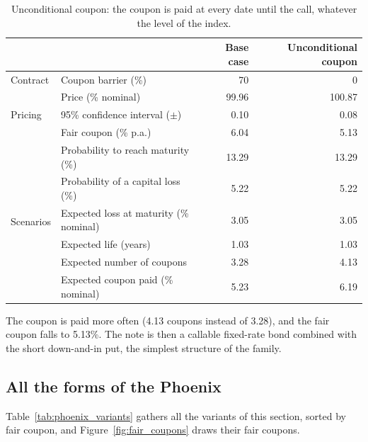 \documentclass[11pt,a4paper]{article}
\begin{document}
\begin{table}[htbp]
  \centering
  \small
  \begin{tabular}{llrr}
    \toprule
     & & \textbf{Base case} & \textbf{Unconditional coupon} \\
    \midrule
    \multirow{1}{*}{Contract}
      & Coupon barrier (\%) & 70 & 0 \\
    \midrule
    \multirow{3}{*}{Pricing}
      & Price (\% nominal) & 99.96 & 100.87 \\
      & 95\% confidence interval ($\pm$) & 0.10 & 0.08 \\
      & Fair coupon (\% p.a.) & 6.04 & 5.13 \\
    \midrule
    \multirow{6}{*}{Scenarios}
      & Probability to reach maturity (\%) & 13.29 & 13.29 \\
      & Probability of a capital loss (\%) & 5.22 & 5.22 \\
      & Expected loss at maturity (\% nominal) & 3.05 & 3.05 \\
      & Expected life (years) & 1.03 & 1.03 \\
      & Expected number of coupons & 3.28 & 4.13 \\
      & Expected coupon paid (\% nominal) & 5.23 & 6.19 \\
    \bottomrule
  \end{tabular}
  \caption{Unconditional coupon: the coupon is paid at every date until the call, whatever the level of the index.}
  \label{tab:phoenix-unconditional}
\end{table}

The coupon is paid more often (4.13 coupons instead of 3.28), and the fair coupon falls to 5.13\%. The note is then a
callable fixed-rate bond combined with the short down-and-in put, the simplest structure of the family.

\clearpage
\subsection{All the forms of the Phoenix}

Table~\ref{tab:phoenix_variants} gathers all the variants of this section, sorted by fair coupon, and
Figure~\ref{fig:fair_coupons} draws their fair coupons.
\end{document}
